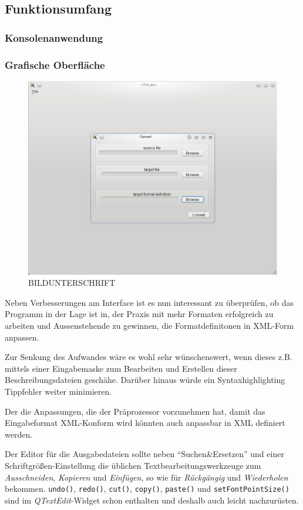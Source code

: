 \documentclass[	a4paper,		%
		titlepage, 		%
		fontsize=12pt		%
		]{scrartcl} 		%
\begin{document}
\subsection{Funktionsumfang}

\subsubsection{Konsolenanwendung}

\subsubsection{Grafische Oberfläche}
\begin{figure} [H]
    \centering
	\includegraphics[width=.5\textwidth, keepaspectratio]{./img/screenshot.eps}
    \caption{BILDUNTERSCHRIFT}
\end{figure}



Neben Verbesserungen am Interface ist es nun interessant zu überprüfen, ob das Programm in der Lage ist in, der Praxis mit mehr Formaten erfolgreich zu arbeiten und Aussenstehende zu gewinnen, die Formatdefinitonen in XML-Form anpassen.

Zur Senkung des Aufwandes wäre es wohl sehr wünschenswert, wenn dieses z.B. mittels einer Eingabemaske zum Bearbeiten und Erstellen dieser Beschreibungsdateien geschähe. Darüber hinaus würde ein Syntaxhighlighting Tippfehler weiter minimieren.

Der die Anpassungen, die der Präprozessor vorzunehmen hat, damit das Eingabeformat XML-Konform wird könnten auch anpassbar in XML definiert werden.

Der Editor für die Ausgabedateien sollte neben ``Suchen\&Ersetzen'' und einer Schriftgrößen-Einstellung die üblichen Textbearbeitungswerkzeuge zum \emph{Ausschneiden}, \emph{Kopieren} und \emph{Einfügen}, so wie für \emph{Rückgängig}  und \emph{Wiederholen} bekommen. \texttt{undo()}, \texttt{redo()}, \texttt{cut()}, \texttt{copy()}, \texttt{paste()} und \texttt{setFontPointSize()} sind im \emph{QTextEdit}-Widget schon enthalten und deshalb auch leicht nachzurüsten.
\end{document}
